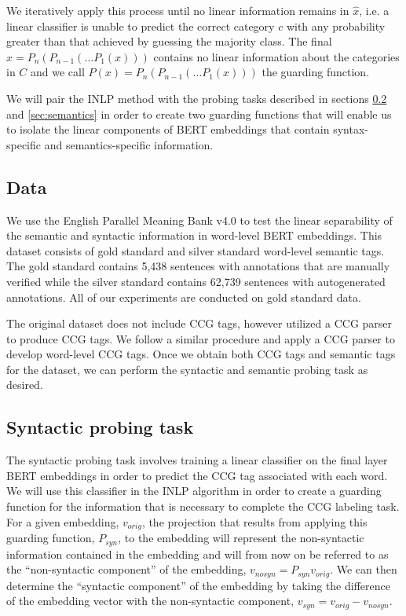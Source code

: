 \documentclass[11pt,a4paper]{article}
\begin{document}
We iteratively apply this process until no linear information remains in $\hat{x}$, i.e. a linear classifier is unable to predict the correct category $c$ with any probability greater than that achieved by guessing the majority class. The final $\hat{x} = P_n(P_{n-1}(\dots P_1(x)))$ contains no linear information about the categories in $C$ and we call $P(x) = P_n(P_{n-1}(\dots P_1(x)))$ the guarding function. 

We will pair the INLP method with the probing tasks described in sections \ref{sec:syntactic} and \ref{sec:semantics} in order to create two guarding functions that will enable us to isolate the linear components of BERT embeddings that contain syntax-specific and semantics-specific information. 


\subsection{Data}
\label{sec:data}

We use the English Parallel Meaning Bank v4.0 \citep{pmbData} to test the linear separability of the semantic and syntactic information in word-level BERT embeddings. This dataset consists of gold standard and silver standard word-level semantic tags. The gold standard contains 5,438 sentences with annotations that are manually verified while the silver standard contains 62,739 sentences with autogenerated annotations. All of our experiments are conducted on gold standard data. 

The original dataset does not include CCG tags, however \citealp{pmbData} utilized a CCG parser to produce CCG tags. We follow a similar procedure and apply a CCG parser \citep{ccg_tagger} to develop word-level CCG tags. Once we obtain both CCG tags and semantic tags for the dataset, we can perform the syntactic and semantic probing task as desired.


\subsection{Syntactic probing task}
\label{sec:syntactic}

The syntactic probing task involves training a linear classifier on the final layer BERT embeddings in order to predict the CCG tag associated with each word. We will use this classifier in the INLP algorithm in order to create a guarding function for the information that is necessary to complete the CCG labeling task. For a given embedding, $v_{orig}$, the projection that results from applying this guarding function, $P_{syn}$, to the embedding will represent the non-syntactic information contained in the embedding and will from now on be referred to as the ``non-syntactic component'' of the embedding, $v_{no syn} = P_{syn} v_{orig}$. We can then determine the ``syntactic component'' of the embedding by taking the difference of the embedding vector with the non-syntactic component, $v_{syn} = v_{orig} - v_{no syn}$.
\end{document}
